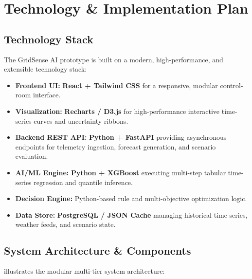 \section{Technology \& Implementation Plan}
\label{sec:technology_implementation}

\subsection{Technology Stack}
\label{subsec:tech_stack}

The GridSense AI prototype is built on a modern, high-performance, and extensible technology stack:
\begin{itemize}[leftmargin=1.5em, itemsep=0.2em]
    \item \textbf{Frontend UI:} \textbf{React + Tailwind CSS} for a responsive, modular control-room interface.
    \item \textbf{Visualization:} \textbf{Recharts / D3.js} for high-performance interactive time-series curves and uncertainty ribbons.
    \item \textbf{Backend REST API:} \textbf{Python + FastAPI} providing asynchronous endpoints for telemetry ingestion, forecast generation, and scenario evaluation.
    \item \textbf{AI/ML Engine:} \textbf{Python + XGBoost} executing multi-step tabular time-series regression and quantile inference.
    \item \textbf{Decision Engine:} Python-based rule and multi-objective optimization logic.
    \item \textbf{Data Store:} \textbf{PostgreSQL / JSON Cache} managing historical time series, weather feeds, and scenario state.
\end{itemize}

\subsection{System Architecture \& Components}
\label{subsec:system_components}

 illustrates the modular multi-tier system architecture:

